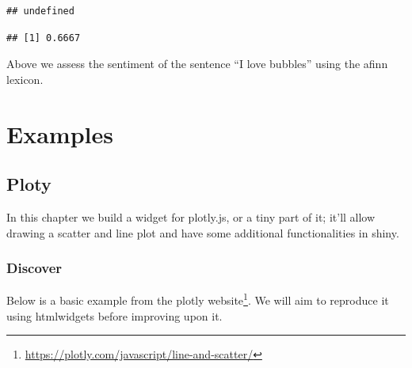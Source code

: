 \documentclass[
]{krantz}
\makeatletter
\newenvironment{Shaded}{\begin{snugshade}}{\end{snugshade}}
\newcommand{\KeywordTok}[1]{\textcolor[rgb]{0.27,0.27,0.27}{\textbf{#1}}}
\newcommand{\NormalTok}[1]{#1}
\newcommand{\OperatorTok}[1]{\textcolor[rgb]{0.43,0.43,0.43}{\textbf{#1}}}
\newcommand{\StringTok}[1]{\textcolor[rgb]{0.5,0.5,0.5}{#1}}
\renewcommand{\href}[2]{#2\footnote{\url{#1}}}
\newenvironment{kframe}{%
\medskip{}
\setlength{\fboxsep}{.8em}
 \def\at@end@of@kframe{}%
 \ifinner\ifhmode%
  \def\at@end@of@kframe{\end{minipage}}%
  \begin{minipage}{\columnwidth}%
 \fi\fi%
 \def\FrameCommand##1{\hskip\@totalleftmargin \hskip-\fboxsep
 \colorbox{shadecolor}{##1}\hskip-\fboxsep
     \hskip-\linewidth \hskip-\@totalleftmargin \hskip\columnwidth}%
 \MakeFramed {\advance\hsize-\width
   \@totalleftmargin\z@ \linewidth\hsize
   \@setminipage}}%
 {\par\unskip\endMakeFramed%
 \at@end@of@kframe}
\renewenvironment{Shaded}{\begin{kframe}}{\end{kframe}}
\makeatother
\begin{document}
\begin{verbatim}
## undefined
\end{verbatim}

\begin{Shaded}
\end{Shaded}

\begin{verbatim}
## [1] 0.6667
\end{verbatim}

Above we assess the sentiment of the sentence ``I love bubbles'' using the afinn lexicon.

\hypertarget{part-examples}{%
\part{Examples}\label{part-examples}}

\hypertarget{ploty}{%
\chapter{Ploty}\label{ploty}}

In this chapter we build a widget for plotly.js, or a tiny part of it; it'll allow drawing a scatter and line plot and have some additional functionalities in shiny.

\hypertarget{discover}{%
\section{Discover}\label{discover}}

Below is a basic example from the \href{https://plotly.com/javascript/line-and-scatter/}{plotly website}. We will aim to reproduce it using htmlwidgets before improving upon it.
\end{document}
